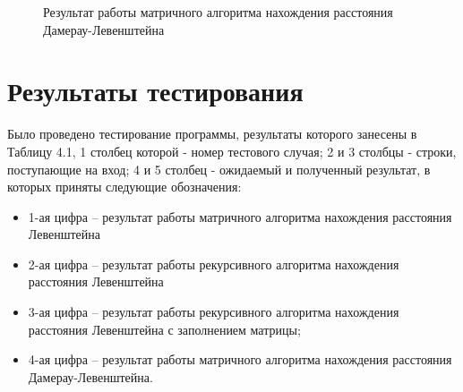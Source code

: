 \documentclass[12pt]{report}
\begin{document}
\begin{figure}[h]
	\caption{Результат работы матричного алгоритма нахождения расстояния Дамерау-Левенштейна}
	\label{figure:image}
\end{figure} 
\newpage
\section{Результаты тестирования} 
Было проведено тестирование программы, результаты которого занесены в Таблицу 4.1, 1 столбец которой - номер тестового случая; 2 и 3 столбцы - строки, поступающие на вход; 4 и 5 столбец - ожидаемый и полученный результат, в которых приняты следующие обозначения: 
\begin{itemize}
	\item 1-ая цифра – результат работы матричного алгоритма нахождения расстояния Левенштейна
	\item 2-ая цифра – результат работы рекурсивного алгоритма нахождения расстояния Левенштейна
	\item 3-ая цифра – результат работы рекурсивного алгоритма нахождения расстояния Левенштейна с заполнением матрицы;
	\item 4-ая цифра – результат работы матричного алгоритма нахождения расстояния Дамерау-Левенштейна.
\end{itemize}
\end{document}
